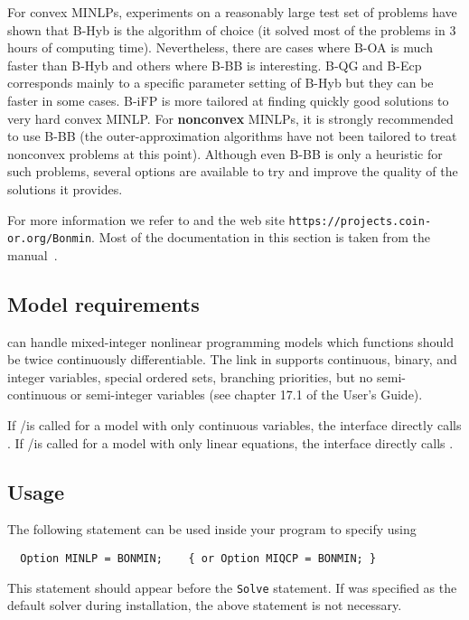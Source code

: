 For convex MINLPs, experiments on a reasonably large test set of problems have shown that B-Hyb is the algorithm of choice (it solved most of the problems in 3 hours of computing time).
Nevertheless, there are cases where B-OA is much faster than B-Hyb and others where B-BB is interesting.
B-QG and B-Ecp corresponds mainly to a specific parameter setting of B-Hyb but they can be faster in some cases.
B-iFP is more tailored at finding quickly good solutions to very hard convex MINLP.
For \textbf{nonconvex} MINLPs, it is strongly recommended to use B-BB (the outer-approximation algorithms have not been tailored to treat nonconvex problems at this point).
Although even B-BB is only a heuristic for such problems, several options are available to try and improve the quality of the solutions it provides.

For more information we refer to \cite{BoGo08,BoKiLi09,BBCCGLLLMSW,BoCoLoMa06} and the \BONMIN web site \texttt{https://projects.coin-or.org/Bonmin}.
Most of the \BONMIN documentation in this section is taken from the \BONMIN manual~\cite{BonminManual}.


\subsection{Model requirements}

\BONMIN can handle mixed-integer nonlinear programming models which functions should be twice continuously differentiable.
The \BONMIN link in \MYGAMS supports continuous, binary, and integer variables, special ordered sets, branching priorities, but no semi-continuous or semi-integer variables (see chapter 17.1 of the \MYGAMS User's Guide).

If \MYGAMS/\BONMIN is called for a model with only continuous variables, the interface directly calls \IPOPT.
If \MYGAMS/\BONMIN is called for a model with only linear equations, the interface directly calls \CBC.

\subsection{Usage}

The following statement can be used inside your \MYGAMS program to specify using \BONMIN
\begin{verbatim}
  Option MINLP = BONMIN;    { or Option MIQCP = BONMIN; }
\end{verbatim}
This statement should appear before the \texttt{Solve} statement.
If \BONMIN was specified as the default solver during \MYGAMS installation, the above statement is not necessary.

